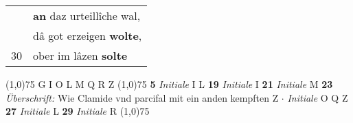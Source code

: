 \documentclass[8pt,a4paper,notitlepage]{article}
\begin{document}
\begin{table}[ht]
\begin{minipage}[t]{0.5\linewidth}
\begin{tabular}{rl}
 & \textbf{an} daz urteillîche wal,\\ 
 & dâ got erzeigen \textbf{wolte},\\ 
30 & ober im lâzen \textbf{solte}\\ 
\end{tabular}
\scriptsize
\line(1,0){75} \newline
G I O L M Q R Z \newline
\line(1,0){75} \newline
\textbf{5} \textit{Initiale} I L  \textbf{19} \textit{Initiale} I  \textbf{21} \textit{Initiale} M  \textbf{23} \textit{Überschrift:} Wie Clamide vnd parcifal mit ein anden kempften Z   $\cdot$ \textit{Initiale} O Q Z  \textbf{27} \textit{Initiale} L  \textbf{29} \textit{Initiale} R  \newline
\line(1,0){75} \newline

\end{minipage}
\end{table}
\end{document}
